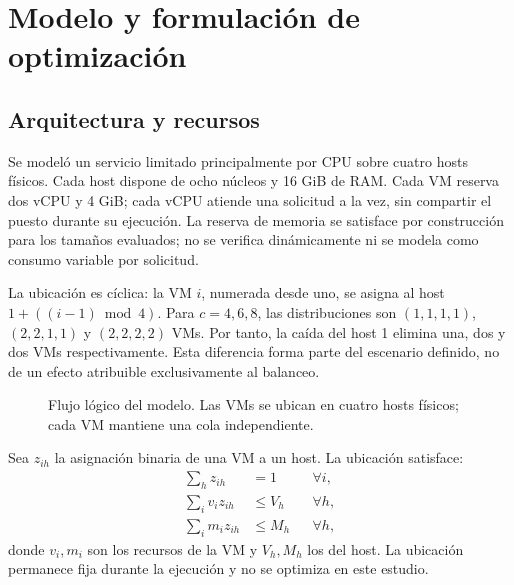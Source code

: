 \section{Modelo y formulación de optimización}
\subsection{Arquitectura y recursos}
Se modeló un servicio limitado principalmente por CPU sobre cuatro hosts físicos. Cada host dispone de ocho núcleos y 16 GiB de RAM. Cada VM reserva dos vCPU y 4 GiB; cada vCPU atiende una solicitud a la vez, sin compartir el puesto durante su ejecución. La reserva de memoria se satisface por construcción para los tamaños evaluados; no se verifica dinámicamente ni se modela como consumo variable por solicitud.

La ubicación es cíclica: la VM $i$, numerada desde uno, se asigna al host $1+((i-1)\bmod4)$. Para $c=4,6,8$, las distribuciones son $(1,1,1,1)$, $(2,2,1,1)$ y $(2,2,2,2)$ VMs. Por tanto, la caída del host 1 elimina una, dos y dos VMs respectivamente. Esta diferencia forma parte del escenario definido, no de un efecto atribuible exclusivamente al balanceo.

\begin{figure}[t]
\centering
{}
\caption{Flujo lógico del modelo. Las VMs se ubican en cuatro hosts físicos; cada VM mantiene una cola independiente.}
\label{fig:modelo}
\end{figure}

Sea $z_{ih}$ la asignación binaria de una VM a un host. La ubicación satisface:
\begin{align}
\sum_h z_{ih}&=1 &&\forall i,\\
\sum_i v_i z_{ih}&\leq V_h &&\forall h,\\
\sum_i m_i z_{ih}&\leq M_h &&\forall h,
\end{align}
donde $v_i,m_i$ son los recursos de la VM y $V_h,M_h$ los del host. La ubicación permanece fija durante la ejecución y no se optimiza en este estudio.

